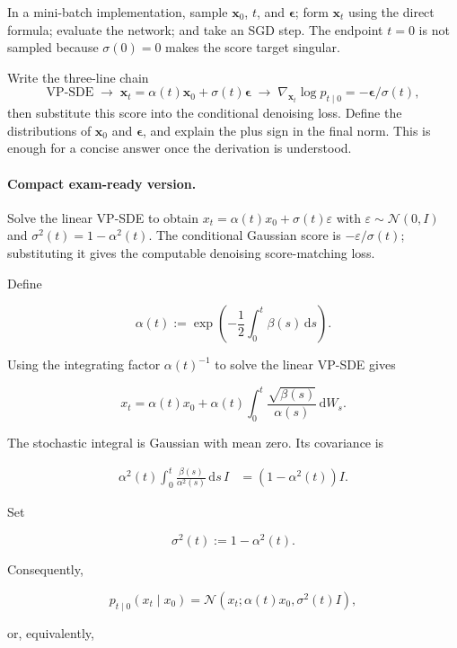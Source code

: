 \documentclass[11pt,a4paper]{article}
\theoremstyle{definition}
\begin{document}
In a mini-batch implementation, sample $\mathbf{x}_0$, $t$, and
$\boldsymbol{\epsilon}$; form $\mathbf{x}_t$ using the direct formula; evaluate the
network; and take an SGD step. The endpoint $t=0$ is not sampled because
$\sigma(0)=0$ makes the score target singular.

\begin{note}
Write the three-line chain
\[
\text{VP-SDE}
\;\longrightarrow\;
\mathbf{x}_t=\alpha(t)\mathbf{x}_0+\sigma(t)\boldsymbol{\epsilon}
\;\longrightarrow\;
\nabla_{\mathbf{x}_t}\log p_{t\mid 0}
=-\boldsymbol{\epsilon}/\sigma(t),
\]
then substitute this score into the conditional denoising loss. Define the distributions
of $\mathbf{x}_0$ and $\boldsymbol{\epsilon}$, and explain the plus sign in the final
norm. This is enough for a concise answer once the derivation is understood.
\end{note}

\paragraph{Compact exam-ready version.}
Solve the linear VP-SDE to obtain $x_t=\alpha(t)x_0+\sigma(t)\varepsilon$ with $\varepsilon\sim\mathcal{N}(0,I)$ and $\sigma^2(t)=1-\alpha^2(t)$. The conditional Gaussian score is $-\varepsilon/\sigma(t)$; substituting it gives the computable denoising score-matching loss.

Define

\[
\alpha(t):=\exp\left(-\frac12\int_0^t\beta(s)\,\mathrm{d}s\right).
\]

Using the integrating factor $\alpha(t)^{-1}$ to solve the linear VP-SDE gives

\[
x_t
= \alpha(t)x_0
+ \alpha(t)\int_0^t \frac{\sqrt{\beta(s)}}{\alpha(s)}\,\mathrm{d}W_s.
\]

The stochastic integral is Gaussian with mean zero. Its covariance is

\begin{align*}
\alpha^2(t)\int_0^t\frac{\beta(s)}{\alpha^2(s)}\,\mathrm{d}s\,I
&= \left(1-\alpha^2(t)\right)I.
\end{align*}

Set

\[
\sigma^2(t):=1-\alpha^2(t).
\]

Consequently,

\[
p_{t\mid 0}(x_t\mid x_0)
= \mathcal{N}\left(x_t;\alpha(t)x_0,\sigma^2(t)I\right),
\]

or, equivalently,
\end{document}
